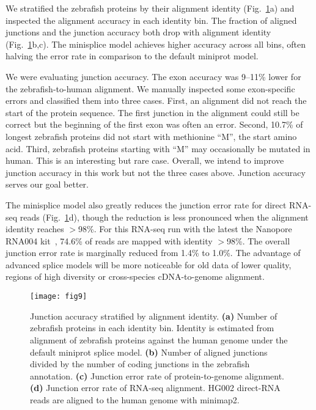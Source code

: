 \documentclass[webpdf,contemporary,large,namedate]{oup-authoring-template}%
\begin{document}
We stratified the zebrafish proteins by their alignment identity (Fig.~\ref{fig:map}a)
and inspected the alignment accuracy in each identity bin.
The fraction of aligned junctions and the junction accuracy both drop with alignment identity (Fig.~\ref{fig:map}b,c).
The minisplice model achieves higher accuracy across all bins, often halving the error rate in comparison to the default miniprot model.

We were evaluating junction accuracy.
The exon accuracy was 9--11\% lower for the zebrafish-to-human alignment.
We manually inspected some exon-specific errors and classified them into three cases.
First, an alignment did not reach the start of the protein sequence.
The first junction in the alignment could still be correct but the beginning of the first exon was often an error.
Second, 10.7\% of longest zebrafish proteins did not start with methionine ``M'', the start amino acid.
Third, zebrafish proteins starting with ``M'' may occasionally be mutated in human.
This is an interesting but rare case.
Overall, we intend to improve junction accuracy in this work but not the three cases above.
Junction accuracy serves our goal better.

The minisplice model also greatly reduces the junction error rate for direct RNA-seq reads (Fig.~\ref{fig:map}d),
though the reduction is less pronounced when the alignment identity reaches $>$98\%.
For this RNA-seq run with the latest the Nanopore RNA004 kit~\citep{Zheng2024.11.17.624050}, 74.6\% of reads are mapped with identity $>$98\%.
The overall junction error rate is marginally reduced from 1.4\% to 1.0\%.
The advantage of advanced splice models will be more noticeable for old data of lower quality, regions of high diversity or cross-species cDNA-to-genome alignment.

\begin{figure}[bt]
\texttt{[image: fig9]}
\caption{Junction accuracy stratified by alignment identity.
{\bf (a)} Number of zebrafish proteins in each identity bin.
Identity is estimated from alignment of zebrafish proteins against the human genome under the default miniprot splice model.
{\bf (b)} Number of aligned junctions divided by the number of coding junctions in the zebrafish annotation.
{\bf (c)} Junction error rate of protein-to-genome alignment.
{\bf (d)} Junction error rate of RNA-seq alignment.
HG002 direct-RNA reads are aligned to the human genome with minimap2.}\label{fig:map}
\end{figure}
\end{document}
